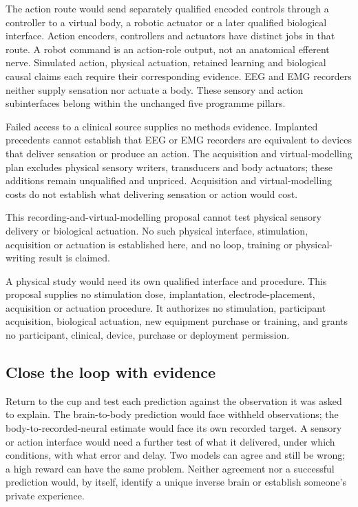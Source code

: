 The action route would send separately qualified encoded controls through a
controller to a virtual body, a robotic actuator or a later qualified biological
interface. Action encoders, controllers and actuators have distinct jobs in
that route. A robot command is an action-role output, not an anatomical efferent
nerve. Simulated action, physical actuation, retained learning and biological
causal claims each require their corresponding evidence. EEG and EMG recorders
neither supply sensation nor actuate a body. These sensory and action
subinterfaces belong within the unchanged five programme pillars.

Failed access to a clinical source supplies no methods evidence. Implanted
precedents cannot establish that EEG or EMG recorders are equivalent to devices
that deliver sensation or produce an action. The acquisition and virtual-modelling
plan excludes physical sensory writers, transducers and body actuators; these
additions remain unqualified and unpriced. Acquisition and virtual-modelling
costs do not establish what delivering sensation or action would cost.

This recording-and-virtual-modelling proposal cannot test physical sensory
delivery or biological actuation. No such physical interface, stimulation,
acquisition or actuation is established here, and no loop, training or
physical-writing result is claimed.

A physical study would need its own qualified interface and procedure. This
proposal supplies no stimulation dose, implantation, electrode-placement,
acquisition or actuation procedure. It authorizes no stimulation, participant
acquisition, biological actuation, new equipment purchase or training, and
grants no participant, clinical, device, purchase or deployment permission.

\subsection{Close the loop with evidence}
Return to the cup and test each prediction against the observation it was
asked to explain. The brain-to-body prediction would face withheld observations;
the body-to-recorded-neural estimate would face its own recorded target.
A sensory or action interface would need a further test of what it delivered,
under which conditions, with what error and delay. Two models can agree and
still be wrong; a high reward can have the same problem. Neither agreement nor
a successful prediction would, by itself, identify a unique inverse brain or
establish someone's private experience.

